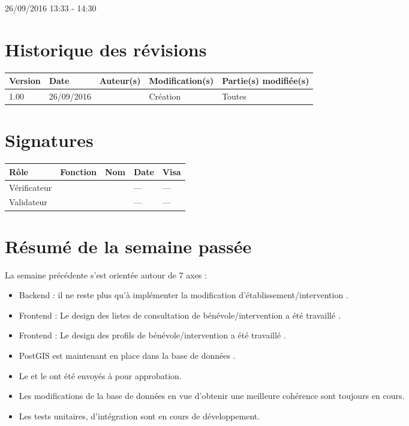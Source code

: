 \documentclass [a4paper] {article}
\begin{document}
26/09/2016			 				%
\hfill   
\hfill 	 13:33 - 14:30				%


\section*{Historique des révisions}
\begin{center}
			\begin{tabular}{| p{2.5cm} | p{3cm} | p{3cm} | p{3cm} | p{3.5cm} |}
				\hline
				\rowcolor{Gray}
				Version & Date & Auteur(s) & Modification(s) & Partie(s) modifiée(s)		 \\
				\hline
				1.00 & 26/09/2016 & \Kafui & Création & Toutes \\
				\hline			
			\end{tabular}
		\end{center}

\section*{Signatures}

		\begin{center}
			\begin{tabular}{| p{2.5cm} | p{4cm} | p{3cm} | p{3cm} | p{2.5cm} |}
				\hline
				\rowcolor{Gray}
				Rôle & Fonction & Nom & Date & Visa		 \\
				\hline
				Vérificateur & \RGC & \Melissa & --- & --- \\[30pt]
				\hline
				Validateur & \CP & \Pierre &  --- & --- \\[30pt]	
				\hline
			\end{tabular}
		\end{center}

\section{Résumé de la semaine passée}
La semaine précédente s'est orientée autour de 7 axes :  
\begin{itemize}
\item Backend : il ne reste plus qu'à implémenter la modification d'établissement/intervention .
\item Frontend : Le design des listes de consultation de bénévole/intervention a été travaillé .
\item Frontend : Le design des profils de bénévole/intervention a été travaillé .
\item PostGIS est maintenant en place dans la base de données .
\item Le \PGC{} et le \PQ{} ont été envoyés à \nomTuteurQualite{} pour approbation.
\item Les modifications de la base de données en vue d'obtenir une meilleure cohérence sont toujours en cours.
\item Les tests unitaires, d'intégration sont en cours de développement.
\end{itemize} 
\end{document}
